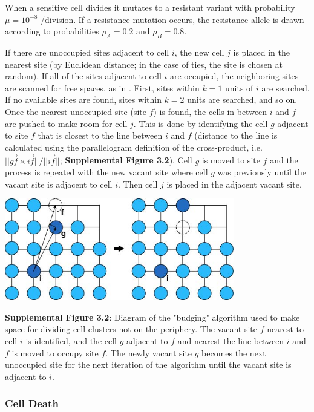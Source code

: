 \documentclass{article}
\begin{document}
When a sensitive cell divides it mutates to a resistant variant with probability $\mu=10^{-8}$ /division.  If a resistance mutation occurs, the resistance allele is drawn according to probabilities $\rho_A=0.2$ and $\rho_B=0.8$.

If there are unoccupied sites adjacent to cell $i$, the new cell $j$ is placed in the nearest site (by Euclidean distance; in the case of ties, the site is chosen at random).  If all of the sites adjacent to cell $i$ are occupied, the neighboring sites are scanned for free spaces, as in \cite{1}.  First, sites within $k=1$ units of $i$ are searched.  If no available sites are found, sites within $k=2$ units are searched, and so on.  Once the nearest unoccupied site (site $f$) is found, the cells in between $i$ and $f$ are pushed to make room for cell $j$.  This is done by identifying the cell $g$ adjacent to site $f$ that is closest to the line between $i$ and $f$ (distance to the line is calculated using the parallelogram definition of the cross-product, i.e. $||\vec{gf}\times\vec{if}||/||\vec{if}||$; \textbf{Supplemental Figure 3.2}).  Cell $g$ is moved to site $f$ and the process is repeated with the new vacant site where cell $g$ was previously until the vacant site is adjacent to cell $i$.  Then cell $j$ is placed in the adjacent vacant site.
 
\begin{center}
\includegraphics[width=0.75\textwidth]{Budging}

\textbf{Supplemental Figure 3.2}: Diagram of the "budging" algorithm used to make space for dividing cell clusters not on the periphery. The vacant site $f$ nearest to cell $i$ is identified, and the cell $g$ adjacent to $f$ and nearest the line between $i$ and $f$ is moved to occupy site $f$. The newly vacant site $g$ becomes the next unoccupied site for the next iteration of the algorithm until the vacant site is adjacent to $i$.
\end{center} 
 
\subsubsection{Cell Death}
\end{document}
